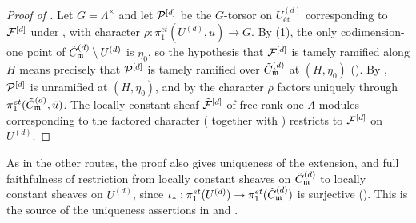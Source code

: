 \begin{proof}[Proof of ]
    Let $G = \Lambda^\times$ and let $\mathcal{P}^{[d]}$ be the $G$-torsor on
    $U^{(d)}_{\text{\'et}}$ corresponding to $\mathcal{F}^{[d]}$ under
    , with character
    $\rho : \pi_1^{et}(U^{(d)}, \bar{u}) \to G$.
    By (1), the only codimension-one point of
    $\tilde{C}_{\mathfrak{m}}^{(d)} \setminus U^{(d)}$ is $\eta_0$, so the hypothesis that $\mathcal{F}^{[d]}$ is tamely
    ramified along $H$ means precisely that $\mathcal{P}^{[d]}$ is tamely ramified over $\tilde{C}_{\mathfrak{m}}^{(d)}$
    at $(H, \eta_0)$ ().
    By , $\mathcal{P}^{[d]}$ is unramified at
    $(H, \eta_0)$, and by  the character $\rho$
    factors uniquely through $\pi_1^{et}(\tilde{C}_{\mathfrak{m}}^{(d)}, \bar{u})$. The locally constant sheaf
    $\tilde{\mathcal{F}}^{[d]}$ of free rank-one $\Lambda$-modules corresponding to the factored
    character ( together with
    ) restricts to $\mathcal{F}^{[d]}$ on $U^{(d)}$.
\end{proof}

\begin{rem*}
    As in the other routes, the proof also gives uniqueness of the extension, and full
    faithfulness of restriction from locally constant sheaves on $\tilde{C}_{\mathfrak{m}}^{(d)}$ to locally
    constant sheaves on $U^{(d)}$, since
    $\iota_* : \pi_1^{et}(U^{(d)}) \to \pi_1^{et}(\tilde{C}_{\mathfrak{m}}^{(d)})$ is surjective
    (). This is the source of the uniqueness
    assertions in  and .
\end{rem*}

